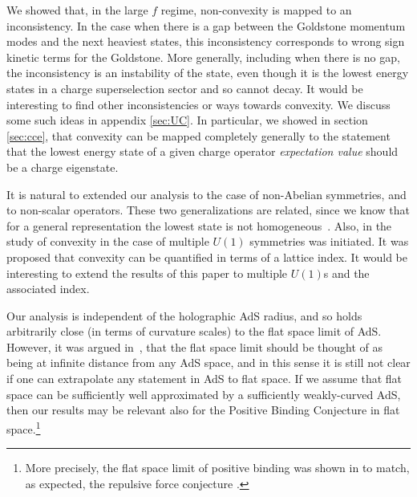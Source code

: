 \documentclass[11pt]{article}
\numberwithin{equation}{section}
\begin{document}
We showed that, in the large $f$ regime, non-convexity is mapped to an inconsistency. In the case when there is a gap between the Goldstone momentum modes and the next heaviest states, this inconsistency corresponds to wrong sign kinetic terms for the Goldstone. More generally, including when there is no gap, the inconsistency is an instability of the state, even though it is the lowest energy states in a charge superselection sector and so cannot decay. It would be interesting to find other inconsistencies or ways towards convexity. We discuss some such ideas in appendix \ref{sec:UC}. In particular, we showed in section \ref{sec:cce}, that convexity can be mapped completely generally to the statement that the lowest energy state of a given charge operator {\it expectation value} should be a charge eigenstate.

		
	It is natural to extended our analysis to the case of non-Abelian symmetries, and to non-scalar operators.
   These two generalizations are related, since we know that for a general representation the lowest state is not homogeneous~\cite{Alvarez-Gaume:2016vff,Hellerman:2017efx,Hellerman:2018sjf,Banerjee:2019jpw}.
  Also, in \cite{Palti:2022unw} the study of convexity in the case of multiple $U(1)$ symmetries was initiated. It was proposed that convexity can be quantified in terms of a lattice index. It would be interesting to extend the results of this paper to multiple $U(1)$s and the associated index.

Our analysis is independent of the holographic AdS radius, and so holds arbitrarily close (in terms of curvature scales) to the flat space limit of AdS. However, it was argued in~\cite{Lust:2019zwm}, that the flat space limit should be thought of as being at infinite distance from any AdS space, and in this sense it is still not clear if one can extrapolate any statement in AdS to flat space. If we assume that flat space can be sufficiently well approximated by a sufficiently weakly-curved AdS, then our results may be relevant also for the Positive Binding Conjecture in flat space.\footnote{More precisely, the flat space limit of positive binding was shown in \cite{Andriolo:2022hax} to match, as expected, the repulsive force conjecture \cite{Palti:2017elp,Heidenreich:2019zkl}.} 
\end{document}
